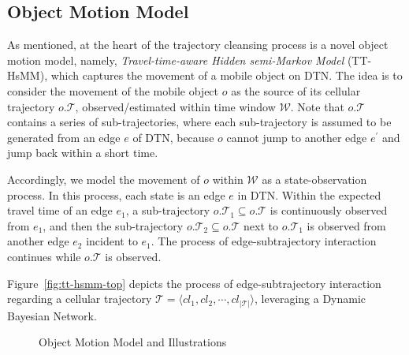 \documentclass{vldb}
\begin{document}
	\subsection{Object Motion Model}
	\label{sub:sec:state-duration-prob}
	
	
	As mentioned, at the heart of the trajectory cleansing process is a novel object motion model, namely, {\it Travel-time-aware Hidden semi-Markov Model} (TT-HsMM), which captures the movement of a mobile object on DTN. The idea is to consider the movement of the mobile object $o$ as the source of its cellular trajectory $o.\mathcal{T}$, observed/estimated within time window $\mathcal{W}$.
	Note that $o.\mathcal{T}$ contains a series of sub-trajectories, where each sub-trajectory is assumed to be generated from an edge $e$ of DTN, because $o$ cannot jump to another edge $e^\prime$ and jump back within a short time. 
	
	Accordingly, we model the movement of $o$ within $\mathcal{W}$ as a state-observation process.
	In this process, each state is an edge $e$ in DTN. Within the expected travel time of an edge $e_1$, a sub-trajectory $o.\mathcal{T}_1\subseteq o.\mathcal{T}$ is continuously observed from $e_1$, and then the sub-trajectory $o.\mathcal{T}_2\subseteq o.\mathcal{T}$ next to $o.\mathcal{T}_1$ is observed from another edge $e_2$ incident to $e_1$.
	The process of edge-subtrajectory interaction continues while $o.\mathcal{T}$ is observed.
	
	Figure~\ref{fig:tt-hsmm-top} depicts the process of edge-subtrajectory interaction regarding a cellular trajectory $\mathcal{T}=\langle cl_1, cl_2, \cdots, cl_{|\mathcal{T}|}\rangle$, leveraging a Dynamic Bayesian Network. 
	
	
	\begin{figure}[!htb]
		\centering
		\vspace{-5pt}
		\vspace{-5pt}
		\caption{Object Motion Model and Illustrations}
		\vspace{-10pt}
		\label{fig:hsmm-dbn} 
	\end{figure}
	
\end{document}
